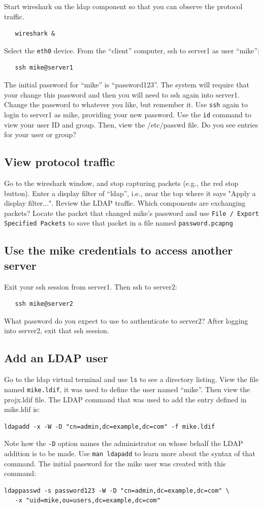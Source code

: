 Start wireshark on the ldap component so that you can observe the protocol traffic.
\begin{verbatim}
   wireshark &
\end{verbatim}
\noindent Select the {\tt eth0} device.
From the ``client'' computer, ssh to server1 as user ``mike'':
\begin{verbatim}
   ssh mike@server1
\end{verbatim}
The initial password for ``mike'' is ``password123''.  The system will require that
your change this password and then you will need to ssh again into server1.  Change
the password to whatever you like, but remember it. Use {\tt ssh} again to login to server1
as mike, providing your new password. Use the {\tt id} command to view your user ID
and group. Then,  view the /etc/passwd file.  Do you see entries
for your user or group?

\subsection{View protocol traffic}
Go to the wireshark window, and stop capturing packets (e.g., the red stop button).
Enter a display filter of ``ldap'', i.e., near the top where it says "Apply a display filter...".
Review the LDAP traffic.  Which components are exchanging packets?  Locate the packet that changed
mike's password and use {\tt File / Export Specified Packets} to save that packet in a file named
{\tt password.pcapng}

\subsection{Use the mike credentials to access another server}
Exit your ssh session from server1.  Then ssh to server2:
\begin{verbatim}
   ssh mike@server2
\end{verbatim}
\noindent What password do you expect to use to authenticate to server2?
After logging into server2, exit that ssh session.

\subsection{Add an LDAP user}
Go to the ldap virtual terminal and use {\tt ls} to see a directory listing.
View the file named {\tt mike.ldif}, it was used to define the user named ``mike''.
Then view the projx.ldif file.
The LDAP command that was used to add the entry defined in mike.ldif is:
\begin{verbatim}
ldapadd -x -W -D "cn=admin,dc=example,dc=com" -f mike.ldif
\end{verbatim}
\noindent Note how the {\tt -D} option names the administrator on whose behalf the
LDAP addition is to be made.  Use {\tt man ldapadd} to learn more about the syntax of
that command. 
The initial password for the mike user was created with this command:
\begin{verbatim}
ldappasswd -s password123 -W -D "cn=admin,dc=example,dc=com" \
   -x "uid=mike,ou=users,dc=example,dc=com"
\end{verbatim}


